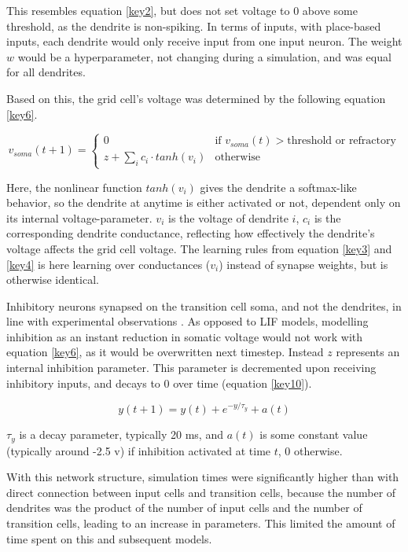 \documentclass{article}
\begin{document}
    This resembles equation \ref{key2}, but does not set voltage to 0 above some threshold, as the dendrite is non-spiking. In terms of inputs, with place-based inputs, each dendrite would only receive input from one input neuron. The weight \(w\) would be a hyperparameter, not changing during a simulation, and was equal for all dendrites.

    Based on this, the grid cell's voltage was determined by the following equation \ref{key6}.

    \begin{equation}\label{key6} v_{soma}(t + 1) = \begin{cases} 0 & \text{if } v_{soma}(t) > \text{threshold or refractory}\\
        z + \sum_{i}^{} c_i \cdot tanh(v_i) & \text{otherwise} \end{cases}\end{equation} 
        
    Here, the nonlinear function \(tanh(v_i)\) gives the dendrite a softmax-like behavior, so the dendrite at anytime is either activated or not, dependent only on its internal voltage-parameter. \(v_i\) is the voltage of dendrite \(i\), \(c_i\) is the corresponding dendrite conductance, reflecting how effectively the dendrite's voltage affects the grid cell voltage. The learning rules from equation \ref*{key3} and \ref*{key4} is here learning over conductances (\(v_i\)) instead of synapse weights, but is otherwise identical.
        
    Inhibitory neurons synapsed on the transition cell soma, and not the dendrites, in line with experimental observations \parencite{Buetfering2014}. As opposed to LIF models, modelling inhibition as an instant reduction in somatic voltage would not work with equation \ref{key6}, as it would be overwritten next timestep. Instead \(z\) represents an internal inhibition parameter. This parameter is decremented upon receiving inhibitory inputs, and decays to 0 over time (equation \ref{key10}).

    \begin{equation}\label{key10} y(t + 1) = y(t) + e^{-y/\tau_y} + a(t) \end{equation}

    \(\tau_y\) is a decay parameter, typically 20 ms, and \(a(t)\) is some constant value (typically around -2.5 v) if inhibition activated at time \(t\), 0 otherwise.

    With this network structure, simulation times were significantly higher than with direct connection between input cells and transition cells, because the number of dendrites was the product of the number of input cells and the number of transition cells, leading to an increase in parameters. This limited the amount of time spent on this and subsequent models.
\end{document}
